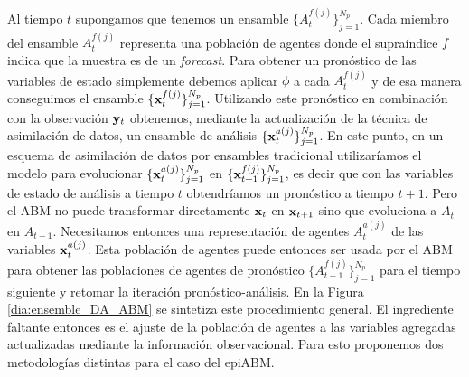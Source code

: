 Al tiempo $t$ supongamos que tenemos un ensamble $\{ A_{t}^{f(j)} \}_{j=1}^{N_p}$. Cada miembro del ensamble $A_{t}^{f(j)}$ representa una población de agentes donde el supraíndice $f$ indica que la muestra es de un \textit{forecast}. Para obtener un pronóstico de las variables de estado simplemente debemos aplicar $\phi$ a cada $A_{t}^{f(j)}$ y de esa manera conseguimos el ensamble $\{ \mathbf{x}_{t}^{f(j)} \}_{j=1}^{N_p}$. Utilizando este pronóstico en combinación con la observación $\mathbf{y}_t$ obtenemos, mediante la actualización de la técnica de asimilación de datos, un ensamble de análisis $\{ \mathbf{x}_{t}^{a(j)} \}_{j=1}^{N_p}$. En este punto, en un esquema de asimilación de datos por ensambles tradicional utilizaríamos el modelo para evolucionar $\{ \mathbf{x}_{t}^{a(j)} \}_{j=1}^{N_p}$ en $\{ \mathbf{x}_{t+1}^{f(j)} \}_{j=1}^{N_p}$, es decir que con las variables de estado de análisis a tiempo $t$ obtendríamos un pronóstico a tiempo $t+1$. Pero el ABM no puede transformar directamente $\mathbf{x}_t$ en $\mathbf{x}_{t+1}$ sino que evoluciona a $A_t$ en $A_{t+1}$. Necesitamos entonces una representación de agentes $A_{t}^{a(j)}$ de las variables $\mathbf{x}_{t}^{a(j)}$. Esta población de agentes puede entonces ser usada por el ABM para obtener las poblaciones de agentes de pronóstico $\{ A_{t+1}^{f(j)} \}_{j=1}^{N_p}$ para el tiempo siguiente y retomar la iteración pronóstico-análisis. En la Figura \ref{dia:ensemble_DA_ABM} se sintetiza este procedimiento general. El ingrediente faltante entonces es el ajuste de la población de agentes a las variables agregadas actualizadas mediante la información observacional. Para esto proponemos dos metodologías distintas para el caso del epiABM.

